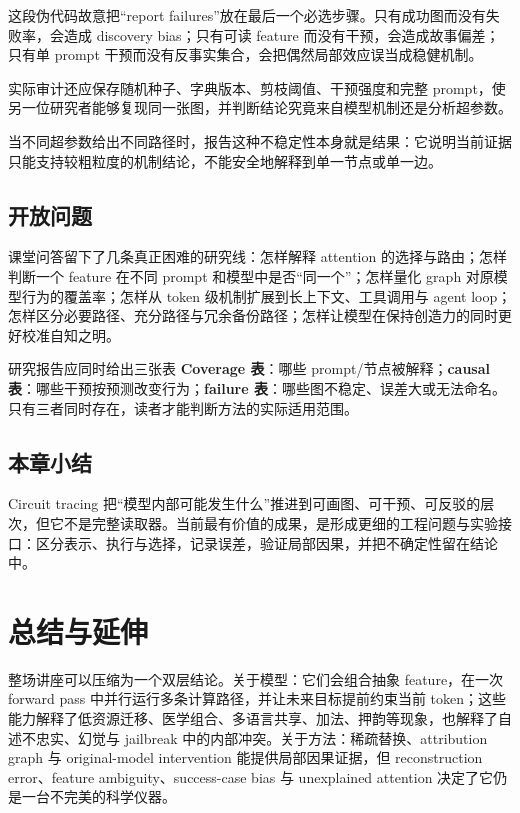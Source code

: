 \documentclass[a4paper]{article}
\begin{document}
这段伪代码故意把“report failures”放在最后一个必选步骤。只有成功图而没有失败率，会造成 discovery bias；只有可读 feature 而没有干预，会造成故事偏差；只有单 prompt 干预而没有反事实集合，会把偶然局部效应误当成稳健机制。

实际审计还应保存随机种子、字典版本、剪枝阈值、干预强度和完整 prompt，使另一位研究者能够复现同一张图，并判断结论究竟来自模型机制还是分析超参数。

当不同超参数给出不同路径时，报告这种不稳定性本身就是结果：它说明当前证据只能支持较粗粒度的机制结论，不能安全地解释到单一节点或单一边。

\subsection{开放问题}

课堂问答留下了几条真正困难的研究线：怎样解释 attention 的选择与路由；怎样判断一个 feature 在不同 prompt 和模型中是否“同一个”；怎样量化 graph 对原模型行为的覆盖率；怎样从 token 级机制扩展到长上下文、工具调用与 agent loop；怎样区分必要路径、充分路径与冗余备份路径；怎样让模型在保持创造力的同时更好校准自知之明。


\begin{knowledgebox}{研究报告应同时给出三张表}
\textbf{Coverage 表}：哪些 prompt/节点被解释；\textbf{causal 表}：哪些干预按预测改变行为；\textbf{failure 表}：哪些图不稳定、误差大或无法命名。只有三者同时存在，读者才能判断方法的实际适用范围。
\end{knowledgebox}

\subsection{本章小结}

Circuit tracing 把“模型内部可能发生什么”推进到可画图、可干预、可反驳的层次，但它不是完整读取器。当前最有价值的成果，是形成更细的工程问题与实验接口：区分表示、执行与选择，记录误差，验证局部因果，并把不确定性留在结论中。

\section{总结与延伸}

整场讲座可以压缩为一个双层结论。关于模型：它们会组合抽象 feature，在一次 forward pass 中并行运行多条计算路径，并让未来目标提前约束当前 token；这些能力解释了低资源迁移、医学组合、多语言共享、加法、押韵等现象，也解释了自述不忠实、幻觉与 jailbreak 中的内部冲突。关于方法：稀疏替换、attribution graph 与 original-model intervention 能提供局部因果证据，但 reconstruction error、feature ambiguity、success-case bias 与 unexplained attention 决定了它仍是一台不完美的科学仪器。
\end{document}
